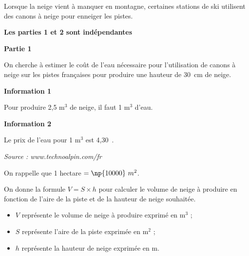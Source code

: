 \documentclass[11pt]{article}
\newcommand{\euro}{\eurologo{}}
\begin{document}
Lorsque la neige vient à manquer en montagne, certaines stations de ski utilisent des canons à neige pour enneiger les pistes.

\medskip

\textbf{Les parties 1 et 2 sont indépendantes}

\medskip

\textbf{Partie 1}

\medskip

On cherche à estimer le coût de l’eau nécessaire pour l'utilisation de canons à neige sur les pistes françaises pour produire une hauteur de 30~cm de neige.

\textbf{Information 1}

Pour produire 2,5 m$^3$ de neige, il faut 1 m$^3$ d’eau.

\textbf{Information 2}

Le prix de l’eau pour 1 m$^3$ est 4,30~\euro.

{\small \emph{Source : www.technoalpin.com/fr}}

On rappelle que 1 hectare $= \np{10000}~m^2$.

On donne la formule $V = S \times h$ pour calculer le volume de neige à produire en fonction de l’aire de la piste et de la hauteur de neige souhaitée.

\begin{itemize}[label=$\bullet~$]
\item $V$ représente le volume de neige à produire exprimé en m$^3$ ;
\item $S$ représente l’aire de la piste exprimée en m$^2$ ;
\item $h$ représente la hauteur de neige exprimée en m.
\end{itemize}

\medskip
\end{document}
